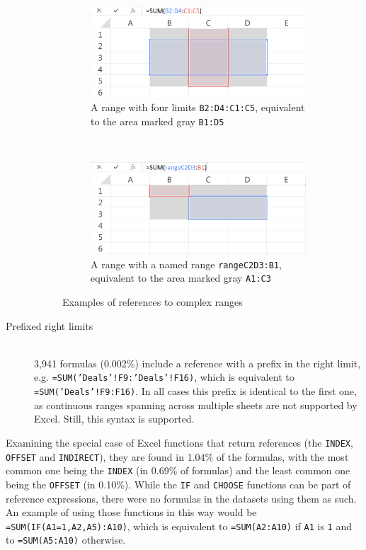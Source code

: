 \documentclass[times]{smrauth}
\begin{document}
\begin{description}
\begin{figure}
\begin{subfigure}[b]{0.49\textwidth}
			\includegraphics[width=1\textwidth]{img/complexRanges}
			\caption{A range with four limits \texttt{B2:D4:C1:C5}, equivalent to the area marked gray \texttt{B1:D5}}
			\label{fig:complexA}
		\end{subfigure}
		~ %
		\begin{subfigure}[b]{0.49\textwidth}
			\centering
			\includegraphics[width=1\textwidth]{img/complexNamedRanges}
			\caption{A range with a named range \texttt{rangeC2D3:B1}, equivalent to the area marked gray \texttt{A1:C3}}
			\label{fig:complexB}
		\end{subfigure}
		\caption{Examples of references to complex ranges}\label{Figure:ComplexRanges}
	\end{figure}	
	\item[Prefixed right limits] \hfill \\
	3,941 formulas (0.002\%) include a reference with a prefix in the right limit, e.g. \texttt{=SUM('Deals'!F9:'Deals'!F16)}, which is equivalent to \texttt{=SUM('Deals'!F9:F16)}. In all cases this prefix is identical to the first one, as continuous ranges spanning across multiple sheets are not supported by Excel. Still, this syntax is supported.
\end{description}

Examining the special case of Excel functions that return references (the \texttt{INDEX}, \texttt{OFFSET} and \texttt{INDIRECT}), they are found in 1.04\% of the formulas, with the most common one being the \texttt{INDEX} (in 0.69\% of formulas) and the least common one being the \texttt{OFFSET} (in 0.10\%).
While the \texttt{IF} and \texttt{CHOOSE} functions can be part of reference expressions, there were no formulas in the datasets using them as such.
An example of using those functions in this way would be \texttt{=SUM(IF(A1=1,A2,A5):A10)}, which is equivalent to \texttt{=SUM(A2:A10)} if \texttt{A1} is \texttt{1} and to \texttt{=SUM(A5:A10)} otherwise.
\end{document}
